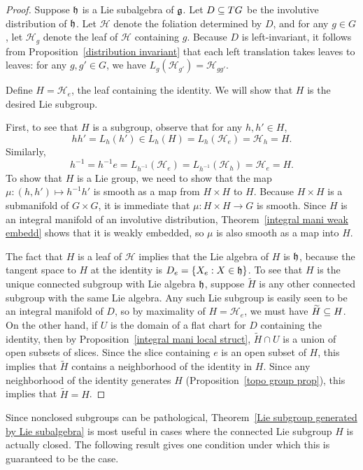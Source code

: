 \begin{proof}
Suppose $\mathfrak{h}$ is a Lie subalgebra of $\mathfrak{g}$. Let $D\subseteq TG$ be the involutive distribution of $\mathfrak{h}$. Let $\mathcal{H}$ 
denote the foliation determined by $D$, and for any $g\in G$, let $\mathcal{H}_g$ denote the leaf of $\mathcal{H}$ 
containing $g$. Because $D$ is left-invariant, it follows from Proposition~\ref{distribution invariant} that each 
left translation takes leaves to leaves: for any $g,g'\in G$, we have $L_g(\mathcal{H}_{g'})=\mathcal{H}_{gg'}$.\par
Define $H=\mathcal{H}_e$, the leaf containing the identity. We will show that $H$ is the desired Lie subgroup.\par
First, to see that $H$ is a subgroup, observe that for any $h,h'\in H$,
\[hh'=L_h(h')\in L_h(H)=L_h(\mathcal{H}_e)=\mathcal{H}_h=H.\]
Similarly,
\[h^{-1}=h^{-1}e=L_{h^{-1}}(\mathcal{H}_e)=L_{h^{-1}}(\mathcal{H}_h)=\mathcal{H}_e=H.\]
To show that $H$ is a Lie group, we need to show that the map $\mu:(h,h')\mapsto h^{-1}h'$ is smooth as a map from 
$H\times H$ to $H$. Because $H\times H$ is a submanifold of $G\times G$, it is immediate that $\mu:H\times H\to G$ 
is smooth. Since $H$ is an integral manifold of an involutive distribution, Theorem~\ref{integral mani weak embedd} shows that it is weakly embedded, so $\mu$ is
also smooth as a map into $H$.\par
The fact that $H$ is a leaf of $\mathcal{H}$ implies that the Lie algebra of $H$ is $\mathfrak{h}$, because the tangent 
space to $H$ at the identity is $D_e=\{X_e:X\in\mathfrak{h}\}$. To see that $H$ is the unique connected subgroup with Lie 
algebra $\mathfrak{h}$, suppose $\widetilde{H}$ is any other connected subgroup with the same Lie algebra. Any such Lie 
subgroup is easily seen to be an integral manifold of $D$, so by maximality of $H=\mathcal{H}_e$, we must have 
$\widetilde{H}\subseteq H$. On the other hand, if $U$ is the domain of a flat chart for $D$ containing the identity, 
then by Proposition~\ref{integral mani local struct}, $\widetilde{H}\cap U$ is a union of open subsets of slices. 
Since the slice containing $e$ is an open subset of $H$, this implies that $\widetilde{H}$ contains a neighborhood 
of the identity in $H$. Since any neighborhood of the identity generates $H$ (Proposition~\ref{topo group prop}), 
this implies that $\widetilde{H}=H$.
\end{proof}
Since nonclosed subgroups can be pathological, Theorem~\ref{Lie subgroup generated by Lie subalgebra} is most useful in cases where the connected Lie subgroup $H$ is actually closed. The following result gives one condition under which this is guaranteed to be the case.
